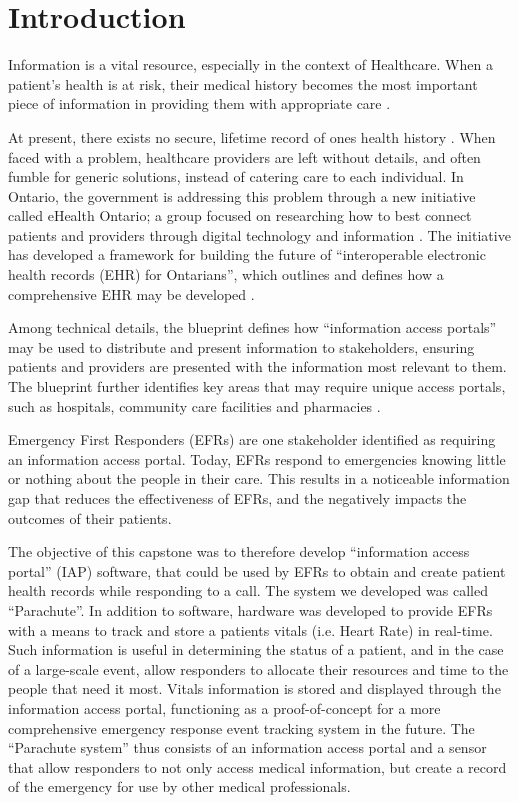 
\section{Introduction}

Information is a vital resource, especially in the context of Healthcare. When a patient's health is at risk, their medical history becomes the most important piece of information in providing them with appropriate care \cite{web1}.

At present, there exists no secure, lifetime record of ones health history \cite{Street2014}. When faced with a problem, healthcare providers are left without details, and often fumble for generic solutions, instead of catering care to each individual. In Ontario, the government is addressing this problem through a new initiative called eHealth Ontario; a group focused on researching how to best connect patients and providers through digital technology and information \cite{web1}. The initiative has developed a framework for building the future of ``interoperable electronic health records (EHR) for Ontarians'', which outlines and defines how a comprehensive EHR may be developed \cite{b1}.

Among technical details, the blueprint defines how ``information access portals'' may be used to distribute and present information to stakeholders, ensuring patients and providers are presented with the information most relevant to them. The blueprint further identifies key areas that may require unique access portals, such as hospitals, community care facilities and pharmacies \cite{Street2014}.

Emergency First Responders (EFRs) are one stakeholder identified as requiring an information access portal. Today, EFRs respond to emergencies knowing little or nothing about the people in their care. This results in a noticeable information gap that reduces the effectiveness of EFRs, and the negatively impacts the outcomes of their patients.

The objective of this capstone was to therefore develop ``information access portal'' (IAP) software, that could be used by EFRs to obtain and create patient health records while responding to a call. The system we developed was called ``Parachute''. In addition to software, hardware was developed to provide EFRs with a means to track and store a patients vitals (i.e. Heart Rate) in real-time. Such information is useful in determining the status of a patient, and in the case of a large-scale event, allow responders to allocate their resources and time to the people that need it most. Vitals information is stored and displayed through the information access portal, functioning as a proof-of-concept for a more comprehensive emergency response event tracking system in the future. The ``Parachute system'' thus consists of an information access portal and a sensor that allow responders to not only access medical information, but create a record of the emergency for use by other medical professionals.
